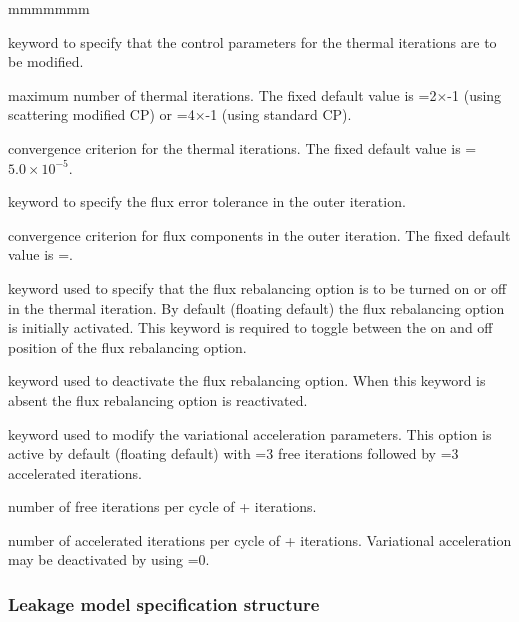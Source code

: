\begin{ListeDeDescription}{mmmmmmm}
\item[\moc{THER}] keyword to specify that the control parameters for the
thermal iterations are to be modified.

\item[\dusa{maxthr}] maximum number of thermal iterations. The fixed default
value is =2$\times$-1 (using scattering modified CP)
or =4$\times$-1 (using standard CP).

\item[\dusa{epsthr}] convergence criterion for the thermal iterations. The
fixed default value is =$5.0\times 10^{-5}$.

\item[\moc{UNKT}] keyword to specify the flux error tolerance in
the outer iteration.

\item[\dusa{epsunk}] convergence criterion for flux components in the outer
iteration. The fixed default value is =.

\item[\moc{REBA}] keyword used to specify that the flux rebalancing option is
to be turned on or off in the thermal iteration. By default (floating default)
the flux rebalancing option is initially activated. This keyword is required to
toggle between the on and off position of the flux rebalancing option. 

\item[\moc{OFF}] keyword used to deactivate the flux rebalancing option. When
this keyword is absent the flux rebalancing option is reactivated.

\item[\moc{ACCE}] keyword used to modify the variational acceleration
parameters. This option is active by default (floating default) with
=3 free iterations followed by =3 accelerated
iterations. 

\item[\dusa{nlibre}] number of free iterations per cycle of
+ iterations. 

\item[\dusa{naccel}] number of accelerated iterations per cycle of
+ iterations. Variational acceleration may be
deactivated by using =0.

\end{ListeDeDescription}
\clearpage

\subsubsection{Leakage model specification structure}\label{sect:descleak}

